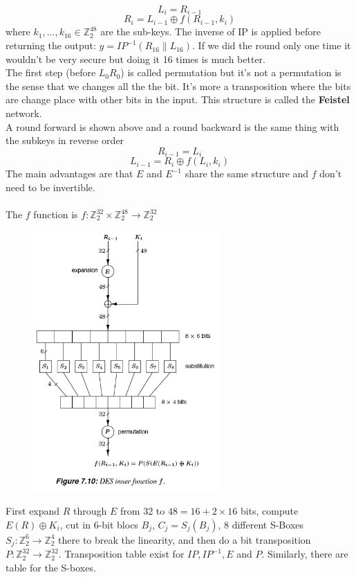 \documentclass[11pt,a4paper]{report}
\begin{document}
$$L_i = R_{i-1}$$
$$R_i = L_{i-1} \oplus f(R_{i-1},k_i)$$
where $k_1,...,k_{16} \in \mathbb{Z}_2^{48}$ are the sub-keys. The inverse of IP is applied before returning the output: $y = IP^{-1}(R_{16} \parallel L_{16} )$. If we did the round only one time it wouldn't be very secure but doing it 16 times is much better.\\
The first step  (before $L_0 R_0$) is called permutation but it's not a permutation is the sense that we changes all the the bit. It's more a transposition where the bits are change place with other bits in the input.
This structure is called the \textbf{Feistel} network.\\
A round forward is shown above and a round backward is the same thing with the subkeys in reverse order
$$R_{i-1} = L_{i}$$
$$L_{i-1} = R_i \oplus f(L_i,k_i)$$
The main advantages are that $E$  and $E^{-1}$ share the same structure and $f$ don't need to be invertible.\\
\\
The $f$ function is $f : \mathbb{Z}_2^{32} \times \mathbb{Z}_2^{48} \rightarrow \mathbb{Z}_2^{32}$\\
\begin{figure}
\vspace{-5mm}
\includegraphics[scale=0.35]{img/img4.png}
\end{figure}

First expand $R$ through $E$ from 32 to $48 = 16 + 2 \times 16$ bits, compute $E(R) \oplus K_i$, cut in 6-bit blocs $B_j$, $C_j = S_j(B_j)$, 8 different S-Boxes $S_j : \mathbb{Z}_2^6 \rightarrow \mathbb{Z}_2^4$ there to break the linearity, and then do a bit transposition $P : \mathbb{Z}_2^{32} \rightarrow \mathbb{Z}_2^{32}$.
Transposition table exist for $IP, IP^{-1}, E$ and $P$. Similarly, there are table for the S-boxes.\\
\\
\end{document}
